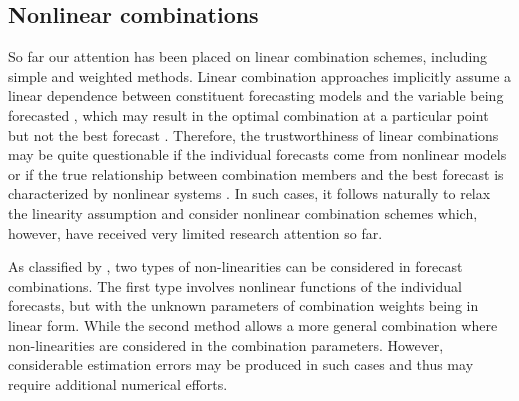\documentclass[11pt]{article}
\begin{document}
\subsection{Nonlinear combinations}
\label{sec:nonlinear_combinations}

So far our attention has been placed on linear combination schemes, including simple and weighted methods. Linear combination approaches implicitly assume a linear dependence between constituent forecasting models and the variable being forecasted \citep{Donaldson1996-um,Freitas2006-fn}, which may result in the optimal combination at a particular point but not the best forecast \citep{Ming_Shi1999-vs}. Therefore, the trustworthiness of linear combinations may be quite questionable if the individual forecasts come from nonlinear models or if the true relationship between combination members and the best forecast is characterized by nonlinear systems \citep{Babikir2016-xz}. In such cases, it follows naturally to relax the linearity assumption and consider nonlinear combination schemes which, however, have received very limited research attention so far.

As classified by \cite{Timmermann2006-en}, two types of non-linearities can be considered in forecast combinations. The first type involves nonlinear functions of the individual forecasts, but with the unknown parameters of combination weights being in linear form. While the second method allows a more general combination where non-linearities are considered in the combination parameters. However, considerable estimation errors may be produced in such cases and thus may require additional numerical efforts.
\end{document}
